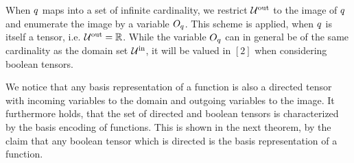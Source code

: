 \begin{remark}
    When $q$ maps into a set of infinite cardinality, we restrict $\mathcal{U}^{\mathrm{out}}$ to the image of $q$ and enumerate the image by a variable $O_{q}$.
    This scheme is applied, when $q$ is itself a tensor, i.e. $\mathcal{U}^{\mathrm{out}}=\mathbb{R}$.
    While the variable $O_{q}$ can in general be of the same cardinality as the domain set $\mathcal{U}^{\mathrm{in}}$, it will be valued in $[2]$ when considering boolean tensors.
\end{remark}

We notice that any basis representation of a function is also a directed tensor with incoming variables to the domain and outgoing variables to the image.
It furthermore holds, that the set of directed and boolean tensors is characterized by the basis encoding of functions.
This is shown in the next theorem, by the claim that any boolean tensor which is directed is the basis representation of a function.

